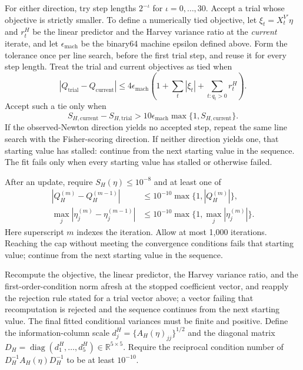 \documentclass[11pt]{article}
\begin{document}
For either direction, try step lengths \(2^{-\iota}\) for \(\iota=0,\ldots,30\). Accept a trial whose
objective is strictly smaller. To define a numerically tied objective, let
\(\xi_t=X_t^{V\prime}\eta\) and \(r_t^H\) be the linear predictor and the Harvey variance ratio at
the \emph{current} iterate, and let
\(\epsilon_{\mathrm{mach}}\) be the binary64 machine epsilon defined above. Form the tolerance once
per line search, before the first trial step, and reuse it for every step length. Treat the trial and
current objectives as tied when
\begin{equation*}
 |Q_{\mathrm{trial}}-Q_{\mathrm{current}}|
 \le4\epsilon_{\mathrm{mach}}
 \left(1+\sum_t|\xi_t|+\sum_{t:q_t>0}r_t^H\right).
\end{equation*}
Accept such a tie only when
\begin{equation*}
 S_{H,\mathrm{current}}-S_{H,\mathrm{trial}}
 >10\epsilon_{\mathrm{mach}}\max\{1,S_{H,\mathrm{current}}\}.
\end{equation*}
If the observed-Newton direction yields no accepted step, repeat the same line search with the
Fisher-scoring direction. If neither direction yields one, that starting value has stalled: continue
from the next starting value in the sequence. The fit fails only when every starting value has
stalled or otherwise failed.

After an update, require \(S_H(\eta)\le10^{-8}\) and at least one of
\begin{align*}
 |Q_H^{(m)}-Q_H^{(m-1)}|&\le10^{-10}\max\{1,|Q_H^{(m)}|\},\\
 \max_j|\eta_j^{(m)}-\eta_j^{(m-1)}|&\le
 10^{-10}\max\{1,\max_j|\eta_j^{(m)}|\}.
\end{align*}
Here superscript \(m\) indexes the iteration. Allow at most 1,000 iterations. Reaching the cap
without meeting the convergence conditions fails that starting value; continue from the next
starting value in the sequence.

Recompute the objective, the linear predictor, the Harvey variance ratio, and the
first-order-condition norm afresh at the stopped coefficient vector, and reapply the rejection rule
stated for a trial vector above; a vector failing that recomputation is rejected and the sequence
continues from the next starting value.
The final fitted conditional variances must be finite and positive. Define the information-column
scale \(d^H_j=\{A_H(\eta)_{jj}\}^{1/2}\) and the diagonal matrix
\(D_H=\operatorname{diag}(d^H_1,\ldots,d^H_5)\in\mathbb R^{5\times5}\). Require the reciprocal
condition number of \(D_H^{-1}A_H(\eta)D_H^{-1}\) to be at least \(10^{-10}\).
\end{document}
